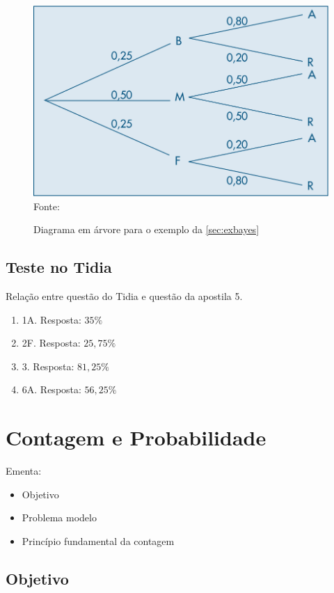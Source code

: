 \documentclass[a4paper]{article}
\begin{document}
	\begin{figure}
		\centering
		\caption{Diagrama em árvore para o exemplo da \autoref{sec:exbayes}}
		\includegraphics[width=0.7\linewidth]{img/diagrama_bayes}
		\\ \vspace{1mm} Fonte: 
		\label{fig:diagramabayes}
	\end{figure}
	
	\subsection{Teste no Tidia}
	
	Relação entre questão do Tidia e questão da apostila 5.
	
	\begin{enumerate}
		\item 1A. Resposta: $35\%$
		\item 2F. Resposta: $25,75\%$
		\item 3. Resposta: $81,25\%$
		\item 6A. Resposta: $56,25\%$
	\end{enumerate}

	\section{Contagem e Probabilidade}
	
	Ementa:
	
	\begin{itemize}
		\item Objetivo
		\item Problema modelo
		\item Princípio fundamental da contagem
	\end{itemize}

	\subsection{Objetivo}
	
\end{document}
